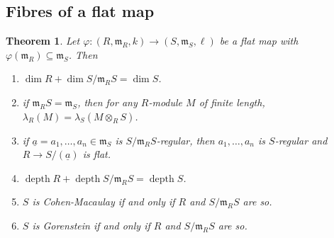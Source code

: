 \documentclass[10pt]{article}
\theoremstyle{thmstyle}
\newtheorem{theorem}{Theorem}[section]
\theoremstyle{defstyle}
\newcommand{\frakm}{\mathfrak{m}} %
\newcommand{\depth}{\operatorname{depth}}
\newcommand{\ul}[1]{\underline{#1}}
\begin{document}
\subsection{Fibres of a flat map}

\begin{theorem}
    Let $\varphi: (R,\frakm_R, k)\to(S,\frakm_S,\ell)$ be a flat map with $\varphi(\frakm_R)\subseteq\frakm_S$. Then 
    \begin{enumerate}[label=(\arabic*)]
        \item $\dim R + \dim S/\frakm_R S = \dim S$.
        \item if $\frakm_RS = \frakm_S$, then for any $R$-module $M$ of finite length, $\lambda_R(M) = \lambda_S(M\otimes_R S)$.
        \item if $\ul a = a_1,\dots,a_n\in\frakm_S$ is $S/\frakm_R S$-regular, then $a_1,\dots,a_n$ is $S$-regular and $R\to S/(\ul a)$ is flat.
        \item $\depth R + \depth S/\frakm_R S = \depth S$.
        \item $S$ is Cohen-Macaulay if and only if $R$ and $S/\frakm_R S$ are so. 
        \item $S$ is Gorenstein if and only if $R$ and $S/\frakm_R S$ are so.
    \end{enumerate}
\end{theorem}
\end{document}
